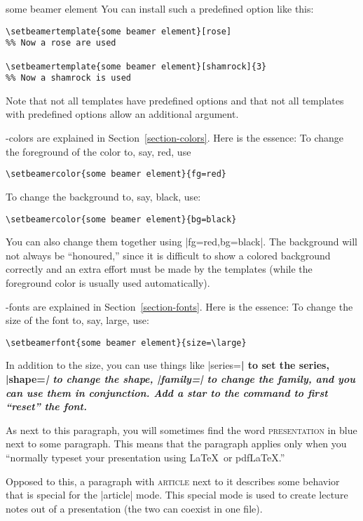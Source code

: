 \begin{element}{some beamer element}
  You can install such a predefined option like this:
\begin{verbatim}
\setbeamertemplate{some beamer element}[rose]
%% Now a rose are used

\setbeamertemplate{some beamer element}[shamrock]{3}
%% Now a shamrock is used
\end{verbatim}
  Note that not all templates have predefined options and that not all templates with predefined options allow an additional argument.

  \beamer-colors are explained in Section~\ref{section-colors}. Here is the essence: To change the foreground of the color to, say, red, use
\begin{verbatim}
\setbeamercolor{some beamer element}{fg=red}
\end{verbatim}

  To change the background to, say, black, use:
\begin{verbatim}
\setbeamercolor{some beamer element}{bg=black}
\end{verbatim}

  You can also change them together using |fg=red,bg=black|. The background will not always be ``honoured,'' since it is difficult to show a colored background correctly and an extra effort must be made by the templates (while the foreground color is usually used automatically).

  \beamer-fonts are explained in Section~\ref{section-fonts}. Here is the essence: To change the size of the font to, say, large, use:
\begin{verbatim}
\setbeamerfont{some beamer element}{size=\large}
\end{verbatim}

  In addition to the size, you can use things like |series=\bfseries| to set the series, |shape=\itshape| to change the shape, |family=\sffamily| to change the family, and you can use them in conjunction. Add a star to the command to first ``reset'' the font.
\end{element}

\beamernote
As next to this paragraph, you will sometimes find the word \textsc{presentation} in blue next to some paragraph. This means that the paragraph applies only when you ``normally typeset your presentation using \LaTeX\ or pdf\LaTeX.''

\articlenote
Opposed to this, a paragraph with \textsc{article} next to it describes some behavior that is special for the |article| mode. This special mode is used to create lecture notes out of a presentation (the two can coexist in one file).

